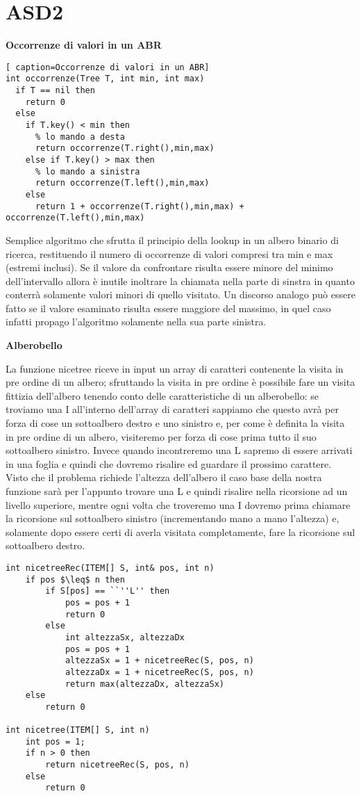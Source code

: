 \documentclass[../cheatSheetAlgoritmi.tex]{subfiles}
\begin{document}
\section{ASD2}
\textbf{Occorrenze di valori in un ABR}
\begin{lstlisting}[ caption=Occorrenze di valori in un ABR]
int occorrenze(Tree T, int min, int max)
  if T == nil then
    return 0
  else
    if T.key() < min then 
      % lo mando a desta
      return occorrenze(T.right(),min,max)
    else if T.key() > max then 
      % lo mando a sinistra
      return occorrenze(T.left(),min,max)
    else
      return 1 + occorrenze(T.right(),min,max) + occorrenze(T.left(),min,max)
\end{lstlisting}
Semplice algoritmo che sfrutta il principio della lookup in un albero binario di ricerca, restituendo il numero di occorrenze di valori compresi tra min e max (estremi inclusi). 
Se il valore da confrontare risulta essere minore del minimo dell'intervallo allora è inutile inoltrare la chiamata nella parte di sinstra in quanto conterrà solamente valori minori di quello visitato. Un discorso analogo può essere fatto se il valore esaminato risulta essere maggiore del massimo, in quel caso infatti propago l'algoritmo solamente nella sua parte sinistra.

\bigskip

\textbf{Alberobello}

La funzione nicetree riceve in input un array di caratteri contenente la visita in pre ordine di un albero; sfruttando la visita in pre ordine è possibile fare un visita fittizia dell'albero tenendo conto delle caratteristiche di un alberobello: se troviamo una I all'interno dell'array di caratteri sappiamo che questo avrà per forza di cose un sottoalbero destro e uno sinistro e, per come è definita la visita in pre ordine di un albero, visiteremo per forza di cose prima tutto il suo sottoalbero sinistro. Invece quando incontreremo una L sapremo di essere arrivati in una foglia e quindi che dovremo risalire ed guardare il prossimo carattere. Visto che il problema richiede l'altezza dell'albero il caso base della nostra funzione sarà per l'appunto trovare una L e quindi risalire nella ricorsione ad un livello superiore, mentre ogni volta che troveremo una I dovremo prima chiamare la ricorsione sul sottoalbero sinistro (incrementando mano a mano l'altezza) e, solamente dopo essere certi di averla visitata completamente, fare la ricorsione sul sottoalbero destro.
\newpage
\begin{lstlisting}[caption=Alberobello]
int nicetreeRec(ITEM[] S, int& pos, int n)
	if pos $\leq$ n then
    	if S[pos] == ``''L'' then
      		pos = pos + 1
      		return 0
    	else
      		int altezzaSx, altezzaDx
      		pos = pos + 1
      		altezzaSx = 1 + nicetreeRec(S, pos, n)
      		altezzaDx = 1 + nicetreeRec(S, pos, n)
      		return max(altezzaDx, altezzaSx)
  	else
    	return 0
    
int nicetree(ITEM[] S, int n)
	int pos = 1;
  	if n > 0 then
    	return nicetreeRec(S, pos, n)
  	else
    	return 0
\end{lstlisting}
\end{document}

